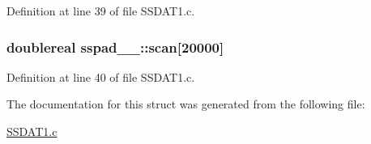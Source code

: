 Definition at line 39 of file S\+S\+D\+A\+T1.\+c.

\subsubsection[{\texorpdfstring{scan}{scan}}]{\setlength{\rightskip}{0pt plus 5cm}doublereal sspad\+\_\+\_\+\+::scan\mbox{[}20000\mbox{]}}\hypertarget{structsspad__1___ae17dfd942ea952afda78c1cd4edb8eb3}{}\label{structsspad__1___ae17dfd942ea952afda78c1cd4edb8eb3}


Definition at line 40 of file S\+S\+D\+A\+T1.\+c.



The documentation for this struct was generated from the following file\+:\begin{DoxyCompactItemize}
\item 
\hyperlink{SSDAT1_8c}{S\+S\+D\+A\+T1.\+c}\end{DoxyCompactItemize}
